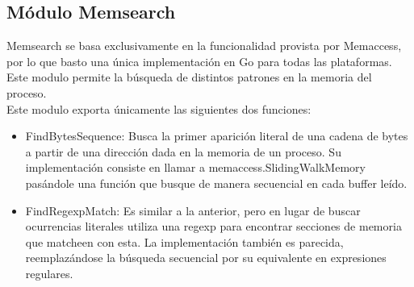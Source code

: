 \subsection{Módulo Memsearch}

Memsearch se basa exclusivamente en la funcionalidad provista por Memaccess,
por lo que basto una única implementación en Go para todas las plataformas.
Este modulo permite la búsqueda de distintos patrones en la memoria del
proceso.\\

Este modulo exporta únicamente las siguientes dos funciones:

\begin{itemize}

\item FindBytesSequence: Busca la primer aparición literal de una cadena de
bytes a partir de una dirección dada en la memoria de un proceso. Su
implementación consiste en llamar a memaccess.SlidingWalkMemory pasándole una
función que busque de manera secuencial en cada buffer leído.\\

\item FindRegexpMatch: Es similar a la anterior, pero en lugar de buscar
ocurrencias literales utiliza una regexp para encontrar secciones de memoria
que matcheen con esta. La implementación también es parecida, reemplazándose la
búsqueda secuencial por su equivalente en expresiones regulares.\\

\end{itemize}

